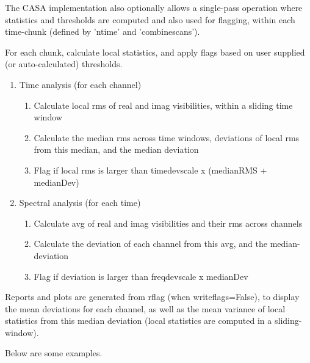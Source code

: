 The CASA implementation also optionally allows a single-pass operation where statistics
and thresholds are computed and also used for flagging, within each time-chunk
(defined by 'ntime' and 'combinescans'). 

For each chunk, calculate local
                         statistics, and apply flags based on user supplied (or auto-calculated) thresholds.

\begin{enumerate}
\item Time analysis (for each channel)
\begin{enumerate}
\item Calculate local rms of real and imag visibilities, within a sliding time window
\item Calculate the median rms across time windows, deviations of local rms from
                              this median, and the median deviation 
\item Flag if local rms is larger than timedevscale x (medianRMS + medianDev)
\end{enumerate}
\item Spectral analysis (for each time)
\begin{enumerate}

\item Calculate avg of real and imag visibilities and their rms across channels
\item Calculate the deviation of each channel from this avg, and the median-deviation
\item Flag if deviation is larger than freqdevscale x medianDev
\end{enumerate}

\end{enumerate}

Reports and plots are generated from rflag (when writeflags=False), to display
the mean deviations for each channel, as well as the mean variance of 
local statistics from this median deviation (local statistics are computed in a 
sliding-window). 


Below are some examples. 

